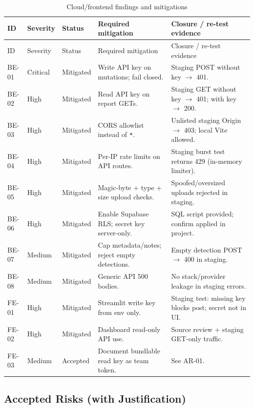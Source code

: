 \documentclass[12pt]{article}
\newcommand{\toprule}{\hline}
\newcommand{\midrule}{\hline}
\newcommand{\bottomrule}{\hline}
\begin{document}
\begin{longtable}{p{}p{}p{}p{}p{}}
\caption{Cloud/frontend findings and mitigations}\label{tab:cloud-mitigations}\\
\toprule
ID & Severity & Status & Required mitigation & Closure / re-test evidence \\
\midrule
\endfirsthead
\toprule
ID & Severity & Status & Required mitigation & Closure / re-test evidence \\
\midrule
\endhead
BE-01 & Critical & Mitigated & Write API key on mutations; fail closed. & Staging POST without key $\rightarrow$ 401. \\
BE-02 & High & Mitigated & Read API key on report GETs. & Staging GET without key $\rightarrow$ 401; with key $\rightarrow$ 200. \\
BE-03 & High & Mitigated & CORS allowlist instead of \texttt{*}. & Unlisted staging Origin $\rightarrow$ 403; local Vite allowed. \\
BE-04 & High & Mitigated & Per-IP rate limits on API routes. & Staging burst test returns 429 (in-memory limiter). \\
BE-05 & High & Mitigated & Magic-byte + type + size upload checks. & Spoofed/oversized uploads rejected in staging. \\
BE-06 & High & Mitigated & Enable Supabase RLS; secret key server-only. & SQL script provided; confirm applied in project. \\
BE-07 & Medium & Mitigated & Cap metadata/notes; reject empty detections. & Empty detection POST $\rightarrow$ 400 in staging. \\
BE-08 & Medium & Mitigated & Generic API 500 bodies. & No stack/provider leakage in staging errors. \\
FE-01 & High & Mitigated & Streamlit write key from env only. & Staging test: missing key blocks post; secret not in UI. \\
FE-02 & High & Mitigated & Dashboard read-only API use. & Source review + staging GET-only traffic. \\
FE-03 & Medium & Accepted & Document bundlable read key as team token. & See AR-01. \\
\bottomrule
\end{longtable}

\subsection{Accepted Risks (with Justification)}
\end{document}
